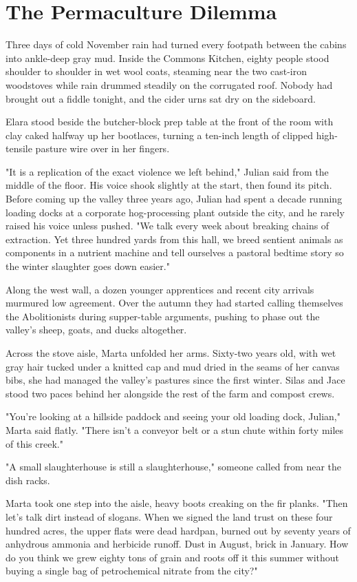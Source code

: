 \chapter{The Permaculture Dilemma}

Three days of cold November rain had turned every footpath between the cabins into ankle-deep gray mud. Inside the Commons Kitchen, eighty people stood shoulder to shoulder in wet wool coats, steaming near the two cast-iron woodstoves while rain drummed steadily on the corrugated roof. Nobody had brought out a fiddle tonight, and the cider urns sat dry on the sideboard.

Elara stood beside the butcher-block prep table at the front of the room with clay caked halfway up her bootlaces, turning a ten-inch length of clipped high-tensile pasture wire over in her fingers.

"It is a replication of the exact violence we left behind," Julian said from the middle of the floor. His voice shook slightly at the start, then found its pitch. Before coming up the valley three years ago, Julian had spent a decade running loading docks at a corporate hog-processing plant outside the city, and he rarely raised his voice unless pushed. "We talk every week about breaking chains of extraction. Yet three hundred yards from this hall, we breed sentient animals as components in a nutrient machine and tell ourselves a pastoral bedtime story so the winter slaughter goes down easier."

Along the west wall, a dozen younger apprentices and recent city arrivals murmured low agreement. Over the autumn they had started calling themselves the Abolitionists during supper-table arguments, pushing to phase out the valley's sheep, goats, and ducks altogether.

Across the stove aisle, Marta unfolded her arms. Sixty-two years old, with wet gray hair tucked under a knitted cap and mud dried in the seams of her canvas bibs, she had managed the valley's pastures since the first winter. Silas and Jace stood two paces behind her alongside the rest of the farm and compost crews.

"You're looking at a hillside paddock and seeing your old loading dock, Julian," Marta said flatly. "There isn't a conveyor belt or a stun chute within forty miles of this creek."

"A small slaughterhouse is still a slaughterhouse," someone called from near the dish racks.

Marta took one step into the aisle, heavy boots creaking on the fir planks. "Then let's talk dirt instead of slogans. When we signed the land trust on these four hundred acres, the upper flats were dead hardpan, burned out by seventy years of anhydrous ammonia and herbicide runoff. Dust in August, brick in January. How do you think we grew eighty tons of grain and roots off it this summer without buying a single bag of petrochemical nitrate from the city?"


